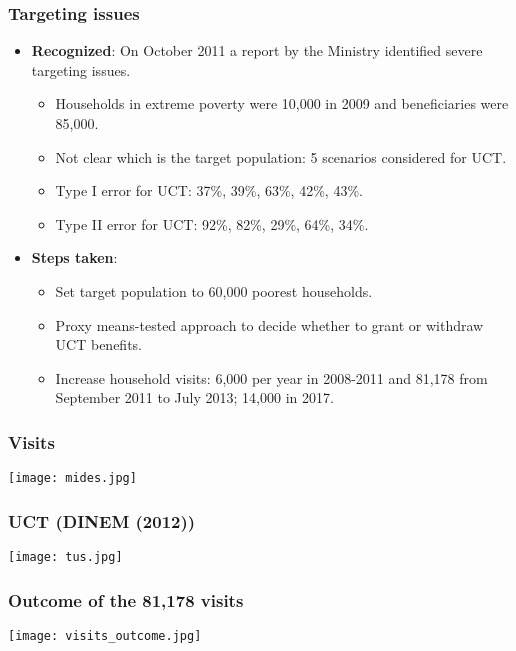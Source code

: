 \documentclass{beamer}
\begin{document}
\begin{frame}
\frametitle{Targeting issues}
		\begin{itemize}
			\item \textbf{Recognized}: On October 2011 a report by the Ministry identified severe targeting issues.
			\begin{itemize}
				\item Households in extreme poverty were 10,000 in 2009 and beneficiaries were 85,000.
				\item Not clear which is the target population: 5 scenarios considered for UCT.
				\item Type I error for UCT: 37\%, 39\%, 63\%, 42\%, 43\%.
				\item Type II error for UCT: 92\%, 82\%, 29\%, 64\%, 34\%.
			\end{itemize}
			\item \textbf{Steps taken}:
			\begin{itemize}
				\item Set target population to 60,000 poorest households.
				\item Proxy means-tested approach to decide whether to grant or withdraw UCT benefits.
				\item Increase household visits: 6,000 per year in 2008-2011 and 81,178 from September 2011 to July 2013; 14,000 in 2017.
			\end{itemize}	
		\end{itemize}
\end{frame}

\begin{frame}
\frametitle{Visits}
\begin{center}
	\texttt{[image: mides.jpg]}
	\label{mides}
\end{center}
\end{frame}

\begin{frame}
\frametitle{UCT (DINEM (2012))}
\begin{center}
	\texttt{[image: tus.jpg]}
	\label{tus}
\end{center}
\end{frame}

\begin{frame}
\frametitle{Outcome of the 81,178 visits}
\begin{center}
	\texttt{[image: visits\_outcome.jpg]}
	\label{tus}
\end{center}
\end{frame}
\end{document}
